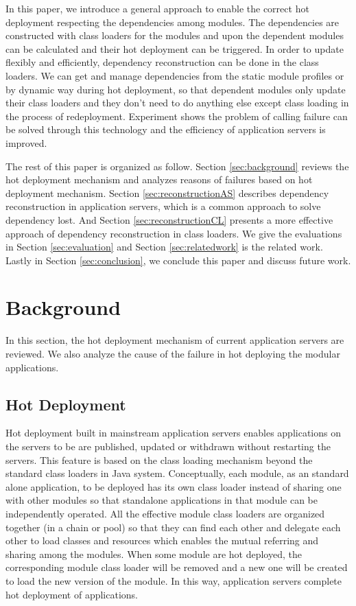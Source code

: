 \documentclass[conference]{IEEEtran}
\begin{document}
In this paper, we introduce a general approach to enable the correct hot deployment respecting the dependencies among modules. The dependencies are constructed with class loaders for the modules and upon the dependent modules can be calculated and their hot deployment can be triggered. In order to update flexibly and efficiently, dependency reconstruction can be done in the class loaders. We can get and manage dependencies from the static module profiles or by dynamic way during hot deployment, so that dependent modules only update their class loaders and they don't need to do anything else except class loading in the process of redeployment. Experiment shows the problem of calling failure can be solved through this technology and the efficiency of application servers is improved.

The rest of this paper is organized as follow. 
Section \ref{sec:background} reviews the hot deployment mechanism and analyzes reasons of failures based on hot deployment mechanism. 
Section \ref{sec:reconstructionAS} describes dependency reconstruction in application servers, which is a common approach to solve dependency lost.
And Section \ref{sec:reconstructionCL} presents a more effective approach of dependency reconstruction in class loaders.
We give the evaluations in Section \ref{sec:evaluation} and Section \ref{sec:relatedwork} is the related work.
Lastly in Section \ref{sec:conclusion}, we conclude this paper and discuss future work.



\section{Background\label{sec:background}}
In this section, the hot deployment mechanism of current application servers are reviewed. We also analyze the cause of the failure in hot deploying the modular applications.

\subsection{Hot Deployment}

Hot deployment built in mainstream application servers enables applications on the servers to be are published, updated or withdrawn without restarting the servers. This feature is based on the class loading mechanism beyond the standard class loaders\cite{standard_cl} in Java system. Conceptually, each module, as an standard alone application, to be deployed has its own class loader instead of sharing one with other modules so that standalone applications in that module can be independently operated. All the effective module class loaders are organized together (in a chain or pool) so that they can find each other and delegate each other to load classes and resources which enables the mutual referring and sharing among the modules. When some module are hot deployed, the corresponding module class loader will be removed and a new one will be created to load the new version of the module. In this way, application servers complete hot deployment of applications\cite{module_cl}.
\end{document}
